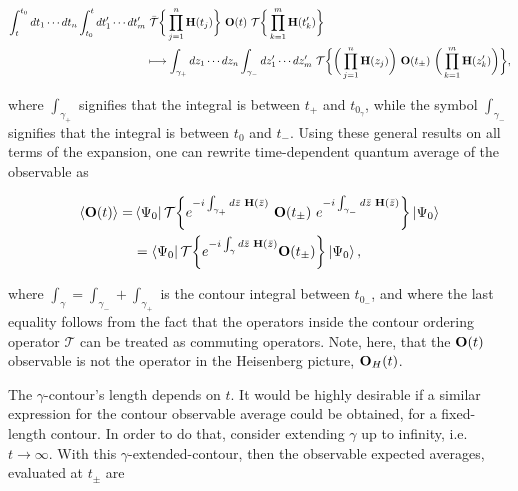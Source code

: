 \begin{equation*}
    \begin{split}
    \int_{t}^{t_0} dt_1 \cdots dt_n \int_{t_0}^{t} dt'_1 \cdots dt'_m& \textnormal{ } \bar{\mathcal{T}} \bigg\{
        \prod_{j = 1}^{n} {\bf H}(t_j) 
    \bigg\} \textnormal{ } {\bf O}(t) \textnormal{ } 
    \mathcal{T}
    \bigg\{
        \prod_{k=1}^{m} {\bf H}(t'_k) 
    \bigg\} \\
    &\longmapsto \int_{\gamma_+} dz_1 \cdots dz_n \int_{\gamma_{-}} dz'_1 \cdots dz'_m \textnormal{ } \mathcal{T} \bigg\{ \bigg(\prod_{j = 1}^{n} {\bf H}(z_j)\bigg) \textnormal{ } {\bf O}(t_{\pm}) \textnormal{ } \bigg(\prod_{k=1}^{m} {\bf H}(z'_k) \bigg)
    \bigg\},
    \end{split}
\end{equation*}

where $\int_{\gamma_+}$ signifies that the integral is between $t_{+}$ and $t_{0_{\gamma}}$, while the symbol $\int_{\gamma_-}$ signifies that the integral is between $t_0$ and $t_{-}$. 
Using these general results on all terms of the expansion, one can rewrite time-dependent quantum average of the observable as 

\begin{equation}\label{NEqQFT_Keldysh_obsavg1}
    \begin{split}
        \langle {\bf O}(t) \rangle =& \bra{\Psi_0} 
        \mathcal{T} \bigg\{
            e^{-i \int_{\gamma_+} d\bar{z} \textnormal{ } {\bf H}(\bar{z})}
            \textnormal{ } {\bf O}(t_{\pm}) \textnormal{ }
            e^{-i \int_{\gamma_-} d\bar{z} \textnormal{ } {\bf H}(\bar{z})}
        \bigg\} 
    \ket{\Psi_0} \\
    &= \bra{\Psi_0}
        \mathcal{T} \bigg\{
            e^{-i \int_{\gamma} d\bar{z} \textnormal{ } {\bf H}(\bar{z})} {\bf O}(t_{\pm}) 
        \bigg\}
    \ket{\Psi_0},
    \end{split}
\end{equation}

where $\int_{\gamma} = \int_{\gamma_{-}} + \int_{\gamma_{+}}$ is the contour integral between $t_{0_-}$, and where the last equality follows from the fact that the operators inside the contour ordering operator $\mathcal{T}$ can be treated as commuting operators. 
Note, here, that the ${\bf O}(t)$ observable is not the operator in the Heisenberg picture, ${\bf O}_H (t)$.

The $\gamma$-contour's length depends on $t$. 
It would be highly desirable if a similar expression for the contour observable average could be obtained, for a fixed-length contour. 
In order to do that, consider extending $\gamma$ up to infinity, i.e. $t \rightarrow \infty$. 
With this $\gamma$-extended-contour, then the observable expected averages, evaluated at $t_{\pm}$ are 

